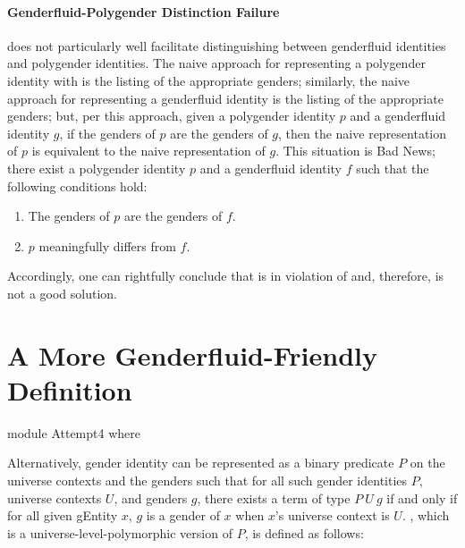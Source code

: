 \documentclass{article}
\begin{document}
\paragraph{Genderfluid-Polygender Distinction Failure}\label{sec:gender3DistinctionFailure}
 does not particularly well facilitate distinguishing between genderfluid identities and polygender identities.  The naive approach for representing a polygender identity with  is the listing of the appropriate genders; similarly, the naive approach for representing a genderfluid identity is the listing of the appropriate genders; but, per this approach, given a polygender identity \(p\) and a genderfluid identity \(g\), if the genders of \(p\) are the genders of \(g\), then the naive  representation of \(p\) is equivalent to the naive  representation of \(g\).  This situation is Bad News; there exist a polygender identity \(p\) and a genderfluid identity \(f\) such that the following conditions hold:

\begin{enumerate}
  \item The genders of \(p\) are the genders of \(f\).
  \item \(p\) meaningfully differs from \(f\).
\end{enumerate}

Accordingly, one can rightfully conclude that  is in violation of  and, therefore, is not a good solution.

\section{A More Genderfluid-Friendly Definition}

\begin{code}
module Attempt4 where
\end{code}

Alternatively, gender identity can be represented as a binary predicate \(P\) on the universe contexts and the genders such that for all such gender identities \(P\), universe contexts \(U\), and genders \(g\), there exists a term of type \(P\ U\ g\) if and only if for all given \gls{gEntity} \(x\), \(g\) is a gender of \(x\) when \(x\)'s universe context is \(U\).  , which is a universe-level-polymorphic version of \(P\), is defined as follows:
\end{document}

